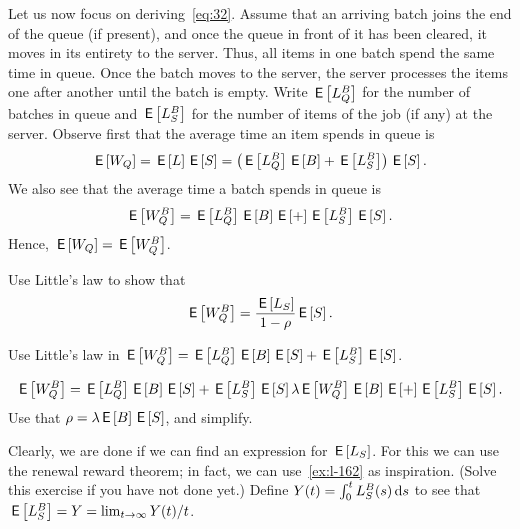 Let us now focus on deriving~\cref{eq:32}.
Assume that an arriving batch joins the end of the queue (if present), and once the queue in front of it has been cleared, it moves in its entirety to the server.
Thus, all items in one batch spend the same time in queue.
Once the batch moves to the server, the server processes the items one after another until the batch is empty.
Write $\E{L_Q^B}$ for the number of batches in queue and $\E{L_S^B}$ for the number of items of the job (if any) at the server.  Observe first that the average time an item spends in queue is
\begin{align*}
  \E{W_Q} = \E L \E S = \left(\E{L_Q^B} \E B + \E{L_S^B}\right)\E S.
\end{align*}
We also see that the average time a batch spends in queue is 
\begin{align*}
  \E{W_Q^B} = \E{L_Q^B} \E B \E + \E{L_S^B}\E S.
\end{align*}
Hence, $\E{W_Q} = \E{W_Q^B}$. 

\begin{exercise}
Use Little's law to show that
 \begin{equation*}
 \E{W^B_{Q}} = \frac{\E{L_S}}{1-\rho}\E{S}.
 \end{equation*}
    \begin{hint}
  Use Little's law in $\E{W_Q^B} = \E{L_Q^B} \E B \E S + \E{L_S^B}\E S$. 
\end{hint}
\begin{solution}
  \begin{align*}
  \E{W_Q^B} = \E{L_Q^B} \E B \E S + \E{L_S^B}\E S 
  \lambda \E{W_Q^B}  \E B \E + \E{L_S^B}\E S. 
  \end{align*}
Use that $\rho = \lambda \E B \E S$, and simplify.
\end{solution}
\end{exercise}

Clearly, we are done if we can find an expression for $\E{L_S}$.
For this we can use the renewal reward theorem; in fact, we can use~\cref{ex:l-162} as inspiration.
(Solve this exercise if you have not done yet.) Define $Y(t) = \int_0^t L_S^B(s) \d s$ to  see that $\E{L_S^B} = Y = \lim_{t\to\infty} Y(t)/t$. 

